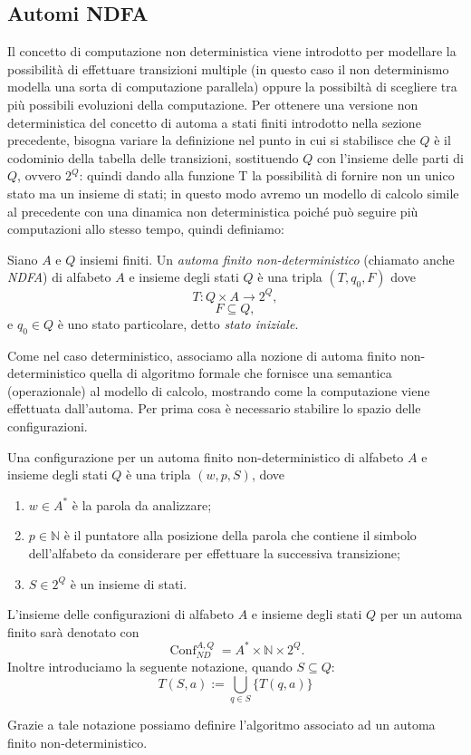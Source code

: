 

\subsection{Automi NDFA}
Il concetto di computazione non deterministica viene introdotto per modellare la possibilità di effettuare
transizioni multiple (in questo caso il non determinismo modella una sorta di computazione parallela) oppure
la possibiltà di scegliere tra più possibili evoluzioni della computazione.
Per ottenere una versione non deterministica del concetto di automa a stati finiti introdotto nella sezione
precedente, bisogna variare la definizione nel punto in cui si stabilisce che $Q$ è il codominio della tabella
delle transizioni, sostituendo $Q$ con l’insieme delle parti di $Q$, ovvero $2^Q$: quindi dando alla funzione T la
possibilità di fornire non un unico stato ma un insieme di stati; in questo modo avremo un modello di calcolo
simile al precedente con una dinamica non deterministica poiché può seguire più computazioni allo stesso
tempo, quindi definiamo:
\begin{defi}
Siano $A$ e $Q$ insiemi finiti. Un \emph{automa finito non-deterministico}
(chiamato anche \textit{NDFA}) di alfabeto $A$ e insieme degli stati $Q$ è una tripla $(T,q_0,F)$ dove
\[
T : Q \times A \longrightarrow 2^Q,
\]
\[
F \subseteq Q,
\]
e $q_0\in Q$ è uno stato particolare, detto \emph{stato iniziale}.
\end{defi}

Come nel caso deterministico, associamo alla nozione di automa finito non-deterministico quella di algoritmo formale che fornisce una semantica (operazionale) al modello di calcolo, mostrando come la computazione viene effettuata dall'automa. Per prima cosa è necessario stabilire lo spazio delle configurazioni.

\begin{defi}
Una configurazione per un automa finito non-deterministico di alfabeto $A$ e insieme degli stati $Q$ è una tripla $(w,p,S)$, dove
\begin{enumerate}
    \item $w\in A^*$ è la parola da analizzare;
    \item $p\in\mathbb{N}$ è il puntatore alla posizione della parola che contiene il simbolo dell'alfabeto da considerare per effettuare la successiva transizione;
    \item $S\in 2^Q$ è un insieme di stati.
\end{enumerate}
L'insieme delle configurazioni di alfabeto $A$ e insieme degli stati $Q$ per un automa finito sarà denotato con
\[
\operatorname{Conf}^{A,Q}_{ND}=A^*\times\mathbb{N}\times 2^Q.
\]
Inoltre introduciamo la seguente notazione, quando $S\subseteq Q$:
\[
T(S,a):=\bigcup_{q\in S}\{T(q,a)\}
\]
\end{defi}
Grazie a tale notazione possiamo definire l'algoritmo associato ad un automa finito non-deterministico.

